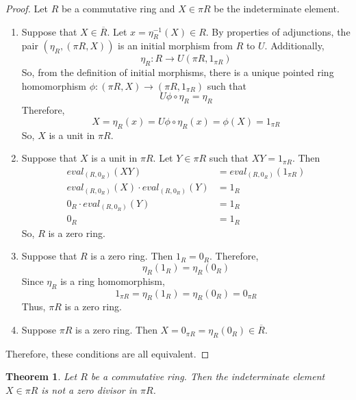 \documentclass[12pt]{article}
\newtheorem{thm}{Theorem}
\begin{document}
\begin{proof}
  Let $R$ be a commutative ring and $X\in\pi R$ be the indeterminate element.
  \begin{enumerate}
    \item Suppose that $X\in\overline{R}$. Let $x=\eta^{-1}_{R}(X)\in R$.
      By properties of adjunctions, the pair $(\eta_R, (\pi R, X))$ is an initial morphism from $R$ to $U$. Additionally, $$\eta_R:R\to U(\pi R, 1_{\pi R})$$
      So, from the definition of initial morphisms, there is a unique pointed ring homomorphism $\phi:(\pi R,X)\to(\pi R,1_{\pi R})$
      such that $$U\phi\circ\eta_{R} = \eta_{R}$$
      Therefore,
      $$X = \eta_{R}(x) = U\phi\circ\eta_{R}(x) = \phi(X) = 1_{\pi R}$$
      So, $X$ is a unit in $\pi R$.
    \item Suppose that $X$ is a unit in $\pi R$. Let $Y\in\pi R$ such that $XY = 1_{\pi R}$. Then
      \begin{align*}
        eval_{(R,0_R)}(XY) &= eval_{(R,0_{R})}(1_{\pi R})\\ 
        eval_{(R,0_R)}(X)\cdot eval_{(R,0_R)}(Y) &= 1_{R}\\ 
        0_{R}\cdot eval_{(R,0_R)}(Y) &= 1_{R}\\
        0_{R}&= 1_{R} 
      \end{align*}
      So, $R$ is a zero ring.
    \item Suppose that $R$ is a zero ring. Then $1_R = 0_R$. Therefore, $$\eta_{R}(1_R)=\eta_{R}(0_R)$$
      Since $\eta_{R}$ is a ring homomorphism,
      $$1_{\pi R} = \eta_{R}(1_R) = \eta_{R}(0_R) = 0_{\pi R}$$
      Thus, $\pi R$ is a zero ring.
    \item Suppose $\pi R$ is a zero ring. Then $X=0_{\pi R}=\eta_{R}(0_{R})\in\overline{R}$. 
  \end{enumerate}
  Therefore, these conditions are all equivalent.
\end{proof}

\begin{thm}
  Let $R$ be a commutative ring. Then the indeterminate element $X\in\pi R$ is not a zero divisor in $\pi R$.
\end{thm}
\end{document}
